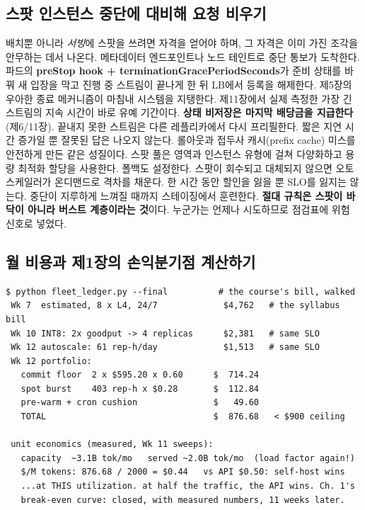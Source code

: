 \subsection*{스팟 인스턴스 중단에 대비해 요청 비우기}

배치뿐 아니라 \textit{서빙}에 스팟을 쓰려면 자격을 얻어야 하며, 그 자격은 이미 가진 조각을 안무하는 데서 나온다. 메타데이터 엔드포인트나 노드 테인트로 중단 통보가 도착한다. 파드의 \textbf{preStop hook + terminationGracePeriodSeconds}가 준비 상태를 바꿔 새 입장을 막고 진행 중 스트림이 끝나게 한 뒤 LB에서 등록을 해제한다. 제5장의 우아한 종료 메커니즘이 마침내 시스템을 지탱한다. 제11장에서 실제 측정한 가장 긴 스트림의 지속 시간이 바로 유예 기간이다. \textbf{상태 비저장은 마지막 배당금을 지급한다}(제6/11장). 끝내지 못한 스트림은 다른 레플리카에서 다시 프리필한다. 짧은 지연 시간 증가일 뿐 잘못된 답은 나오지 않는다. 롤아웃과 접두사 캐시(prefix cache) 미스를 안전하게 만든 같은 성질이다. 스팟 풀은 영역과 인스턴스 유형에 걸쳐 다양화하고 용량 최적화 할당을 사용한다. 폴백도 설정한다. 스팟이 회수되고 대체되지 않으면 오토스케일러가 온디맨드로 격차를 채운다. 한 시간 동안 할인을 잃을 뿐 SLO를 잃지는 않는다. 중단이 지루하게 느껴질 때까지 스테이징에서 훈련한다. \textbf{절대 규칙은 스팟이 바닥이 아니라 버스트 계층이라는 것}이다. 누군가는 언제나 시도하므로 점검표에 위험 신호로 넣었다.

\subsection*{월 비용과 제1장의 손익분기점 계산하기}

\begin{terminalbox}
\begin{Verbatim}[breaklines=true,breakanywhere=true,fontsize=\small,formatcom=\color{tbbtermfg},codes=\tbbcodeactive]
$ python fleet_ledger.py --final          # the course's bill, walked
 Wk 7  estimated, 8 x L4, 24/7             $4,762   # the syllabus bill
 Wk 10 INT8: 2x goodput -> 4 replicas      $2,381   # same SLO
 Wk 12 autoscale: 61 rep-h/day             $1,513   # same SLO
 Wk 12 portfolio:
   commit floor  2 x $595.20 x 0.60      $  714.24
   spot burst    403 rep-h x $0.28       $  112.84
   pre-warm + cron cushion               $   49.60
   TOTAL                                 $  876.68   < $900 ceiling

 unit economics (measured, Wk 11 sweeps):
   capacity  ~3.1B tok/mo   served ~2.0B tok/mo  (load factor again!)
   $/M tokens: 876.68 / 2000 = $0.44   vs API $0.50: self-host wins
   ...at THIS utilization. at half the traffic, the API wins. Ch. 1's
   break-even curve: closed, with measured numbers, 11 weeks later.
\end{Verbatim}
\end{terminalbox}

